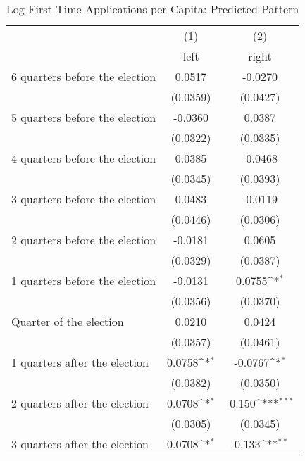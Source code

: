 \begin{table}[htbp]\centering
\def\sym#1{\ifmmode^{#1}\else\(^{#1}\)\fi}
\caption{Log First Time Applications per Capita: Predicted Pattern}
\begin{tabular}{l*{2}{c}}
\hline\hline
                    &\multicolumn{1}{c}{(1)}&\multicolumn{1}{c}{(2)}\\
                    &\multicolumn{1}{c}{left}&\multicolumn{1}{c}{right}\\
\hline
 6 quarters before the election&      0.0517         &     -0.0270         \\
                    &    (0.0359)         &    (0.0427)         \\
[1em]
 5 quarters before the election&     -0.0360         &      0.0387         \\
                    &    (0.0322)         &    (0.0335)         \\
[1em]
 4 quarters before the election&      0.0385         &     -0.0468         \\
                    &    (0.0345)         &    (0.0393)         \\
[1em]
 3 quarters before the election&      0.0483         &     -0.0119         \\
                    &    (0.0446)         &    (0.0306)         \\
[1em]
 2 quarters before the election&     -0.0181         &      0.0605         \\
                    &    (0.0329)         &    (0.0387)         \\
[1em]
 1 quarters before the election&     -0.0131         &      0.0755\sym{*}  \\
                    &    (0.0356)         &    (0.0370)         \\
[1em]
Quarter of the election&      0.0210         &      0.0424         \\
                    &    (0.0357)         &    (0.0461)         \\
[1em]
 1 quarters after the election&      0.0758\sym{*}  &     -0.0767\sym{*}  \\
                    &    (0.0382)         &    (0.0350)         \\
[1em]
 2 quarters after the election&      0.0708\sym{*}  &      -0.150\sym{***}\\
                    &    (0.0305)         &    (0.0345)         \\
[1em]
 3 quarters after the election&      0.0708\sym{*}  &      -0.133\sym{**} \\

\end{tabular}
\end{table}
